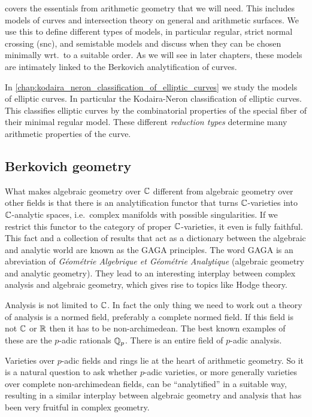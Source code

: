  covers the essentials from arithmetic geometry that we will need.
This includes models of curves and intersection theory on general and arithmetic surfaces. 
We use this to define different types of models, in particular regular, strict normal crossing (snc), and semistable models and discuss when they can be chosen minimally wrt.\ to a suitable order. 
As we will see in later chapters, these models are intimately linked to the Berkovich analytification of curves. 

In \cref{chap:kodaira_neron_classification_of_elliptic_curves} we study the models of elliptic curves. 
In particular the Kodaira-Neron classification of elliptic curves. 
This classifies elliptic curves by the combinatorial properties of the special fiber of their minimal regular model. 
These different \emph{reduction types} determine many arithmetic properties of the curve.

\subsection{Berkovich geometry} \label{sec:berkovich_geometry}
What makes algebraic geometry over $\mathbb{C}$ different from algebraic geometry over other fields is that there is an analytification functor that turns $\mathbb{C}$-varieties into $\mathbb{C}$-analytic spaces, i.e.\ complex manifolds with possible singularities. 
If we restrict this functor to the category of proper  $\mathbb{C}$-varieties, it even is fully faithful. 
This fact and a collection of results that act as a dictionary between the algebraic and analytic world are known as the GAGA principles. 
The word GAGA is an abreviation of \emph{Géométrie Algebrique et Géométrie Analytique} (algebraic geometry and analytic geometry). 
They lead to an interesting interplay between complex analysis and algebraic geometry, which gives rise to topics like Hodge theory. 

Analysis is not limited to $\mathbb{C}$. 
In fact the only thing we need to work out a theory of analysis is a normed field, preferably a complete normed field. 
If this field is not $\mathbb{C}$ or $\mathbb{R}$ then it has to be non-archimedean. 
The best known examples of these are the $p$-adic rationals $\mathbb{Q}_p$. 
There is an entire field of $p$-adic analysis.  

Varieties over $p$-adic fields and rings lie at the heart of arithmetic geometry. 
So it is a natural question to ask whether $p$-adic varieties, or more generally varieties over complete non-archimedean fields, can be ``analytified'' in a suitable way, resulting in a similar interplay between algebraic geometry and analysis that has been very fruitful in complex geometry. 

